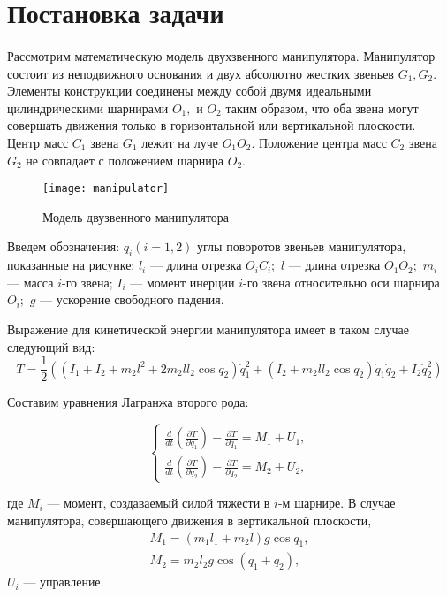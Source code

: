\section{Постановка задачи} \label{p21}
\paragraph{}
Рассмотрим математическую модель двухзвенного манипулятора. Манипулятор состоит из неподвижного основания и двух абсолютно жестких звеньев $G_1, G_2$. Элементы конструкции соединены между собой двумя идеальными цилиндрическими шарнирами $O_1,$ и $O_2$ таким образом, что оба звена могут совершать движения только в горизонтальной или вертикальной плоскости. Центр масс $C_1$ звена $G_1$ лежит на луче $O_1 O_2.$ Положение центра масс $C_2$ звена $G_2$ не совпадает с положением шарнира $O_2$.

 \begin{figure}[h]
 	\centering
 	\texttt{[image: manipulator]}
 	\caption{Модель двузвенного манипулятора}
 	\label{fig:manip2_chains}
 \end{figure}

Введем обозначения: $q_i (i=1, 2)$ \textemdash углы поворотов звеньев манипулятора, показанные на рисунке; $l_i$ --- длина отрезка $O_i C_i;$ $l$ --- длина отрезка $O_1 O_2;$ $m_i$  ---  масса   $i$-го звена;   $I_i$ --- момент инерции  $i$-го звена относительно оси шарнира $O_i;$ $g$ --- ускорение свободного падения.

Выражение для кинетической энергии манипулятора имеет в таком случае следующий вид:
\begin{equation}
T = \frac12 ((I_1 + I_2 + m_2 l^2 + 2 m_2 l l_2 \cos q_2) \dot q_1^2 + (I_2 + m_2 l l_2 \cos q_2) \dot q_1 \dot q_2 + I_2 \dot q_2^2)  \label{2chain_kinet}
\end{equation}

Составим уравнения Лагранжа второго рода:

\begin{equation*}
\begin{cases}
\displaystyle \frac{d}{dt} \left( \frac{\partial T}{\partial \dot q_1} \right) - \frac{\partial T}{\partial q_1} = M_1 + U_1, \\
\displaystyle \frac{d}{dt} \left( \frac{\partial T}{\partial \dot q_2} \right) - \frac{\partial T}{\partial q_2} = M_2 + U_2, \label{2chain_lagrange}
\end{cases}
\end{equation*}

где $M_i$ --- момент, создаваемый силой тяжести в $i$-м шарнире. В случае манипулятора, совершающего движения в вертикальной плоскости, 
$$
\begin{array}{l}
M_1 = (m_1 l_1 + m_2 l) g \cos q_1, \\
M_2 = m_2 l_2 g \cos (q_1 + q_2),
\end{array}
$$
$U_i$ --- управление.


